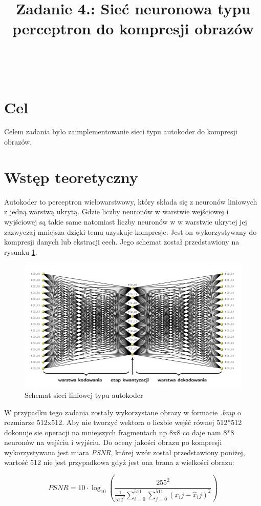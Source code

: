 \documentclass{classrep}
\author{%
    \studentinfo[239671@edu.p.lodz.pl]{Jan Karwowski}{239671}\\
    \studentinfo[239676@edu.p.lodz.pl]{Kamil Kowalewski}{239676}\\
}
\title{Zadanie 4.: Sieć neuronowa typu perceptron do kompresji obrazów}
\begin{document}
    \maketitle
    \thispagestyle{fancyplain}

    \tableofcontents
    \newpage

    \section{Cel} {
        Celem zadania było zaimplementowanie sieci typu autokoder do kompresji obrazów.
    }

    \section{Wstęp teoretyczny}
    \label{theoretical_intro} {
        Autokoder to perceptron wielowarstwowy, który składa się z neuronów liniowych z
        jedną warstwą ukrytą. Gdzie liczby neuronów w warstwie wejściowej i wyjściowej
        są takie same natomiast liczby neuronów w w warstwie ukrytej jej zazwyczaj
        mniejsza dzięki temu uzyskuje kompresje. Jest on wykorzystywany do kompresji
        danych lub ekstracji cech. Jego schemat został przedstawiony na rysunku
        \ref{autokoder}.

        \begin{figure}[!htbp]
            \centering
            \includegraphics[width=\textwidth]{img/autokoder.png}
            \caption{Schemat sieci liniowej typu autokoder}
            \label{autokoder}
        \end{figure}
        \FloatBarrier

        W przypadku tego zadania zostały wykorzystane obrazy w formacie \textit{.bmp}
        o rozmiarze 512x512. Aby nie tworzyć wektora o liczbie wejść równej 512*512
        dokonuje sie operacji na mniejszych fragmentach np 8x8 co daje nam 8*8 neuronów
        na wejściu i wyjściu. Do oceny jakości obrazu po kompresji wykorzystywana jest
        miara \textit{PSNR}, której wzór został przedstawiony poniżej, wartość 512 nie
        jest przypadkowa gdyż jest ona brana z wielkości obrazu:

        \begin{equation}
            PSNR = 10 \cdot \log_{10} \left(\frac{255^2}{\frac{1}{512^2}\sum_{i=0}^{511}\sum_{j=0}^{511}(x_ij - \hat{x}_ij)^2} \right)
        \end{equation}

    }
\end{document}
